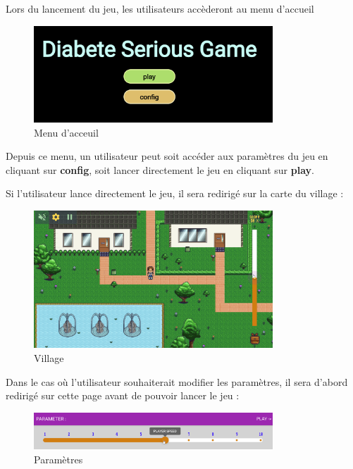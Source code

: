 Lors du lancement du jeu, les utilisateurs accèderont au menu d'accueil

\begin{figure}[H]
    \centering
    \includegraphics[width=0.8\textwidth ]{images/startingPage/start.png}
    \caption{Menu d'acceuil}
    \label{fig:pic_dessus}
\end{figure}

Depuis ce menu, un utilisateur peut soit accéder aux paramètres du jeu en cliquant sur \textbf{config}, soit lancer directement le jeu en cliquant sur \textbf{play}.

Si l'utilisateur lance directement le jeu, il sera redirigé sur la carte du village :

\begin{figure}[H]
    \centering
    \includegraphics[width=0.8\textwidth ]{images/startingPage/village1.png}
    \caption{Village}
    \label{fig:pic_dessus}
\end{figure}

Dans le cas où l'utilisateur souhaiterait modifier les paramètres, il sera d'abord redirigé sur cette page avant de pouvoir lancer le jeu :
\begin{figure}[H]
    \centering
    \includegraphics[width=0.8\textwidth ]{images/startingPage/setting.png}
    \caption{Paramètres}
    \label{fig:pic_dessus}
\end{figure}